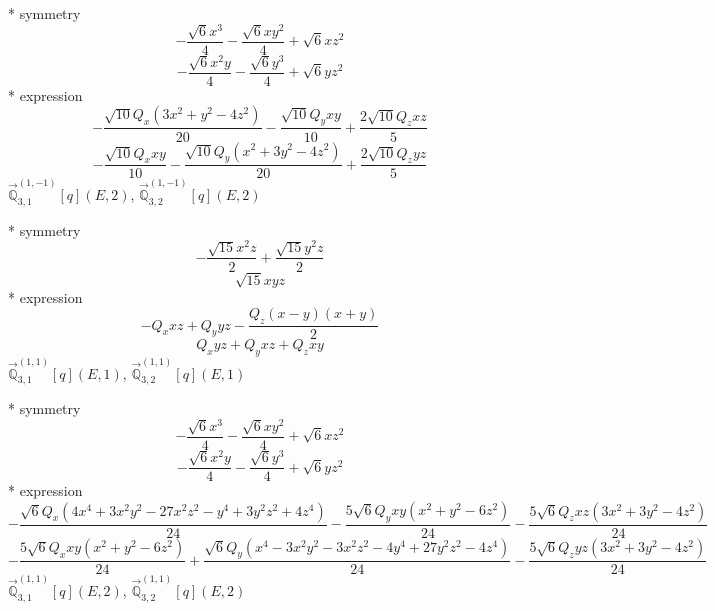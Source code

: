 \documentclass[fleqn,8pt]{jsarticle}
\begin{document}
\noindent\quad ** symmetry
\begin{dmath*}
- \frac{\sqrt{6} x^{3}}{4} - \frac{\sqrt{6} x y^{2}}{4} + \sqrt{6} x z^{2}
\end{dmath*}
\begin{dmath*}
- \frac{\sqrt{6} x^{2} y}{4} - \frac{\sqrt{6} y^{3}}{4} + \sqrt{6} y z^{2}
\end{dmath*}
\noindent\quad ** expression
\begin{dmath*}
- \frac{\sqrt{10} Q_{x} \left(3 x^{2} + y^{2} - 4 z^{2}\right)}{20} - \frac{\sqrt{10} Q_{y} x y}{10} + \frac{2 \sqrt{10} Q_{z} x z}{5}
\end{dmath*}
\begin{dmath*}
- \frac{\sqrt{10} Q_{x} x y}{10} - \frac{\sqrt{10} Q_{y} \left(x^{2} + 3 y^{2} - 4 z^{2}\right)}{20} + \frac{2 \sqrt{10} Q_{z} y z}{5}
\end{dmath*}
\noindent\quad $\vec{\mathbb{Q}}_{3,1}^{(1,-1)}[q](E,2)$, $\vec{\mathbb{Q}}_{3,2}^{(1,-1)}[q](E,2)$

\noindent\quad ** symmetry
\begin{dmath*}
- \frac{\sqrt{15} x^{2} z}{2} + \frac{\sqrt{15} y^{2} z}{2}
\end{dmath*}
\begin{dmath*}
\sqrt{15} x y z
\end{dmath*}
\noindent\quad ** expression
\begin{dmath*}
- Q_{x} x z + Q_{y} y z - \frac{Q_{z} \left(x - y\right) \left(x + y\right)}{2}
\end{dmath*}
\begin{dmath*}
Q_{x} y z + Q_{y} x z + Q_{z} x y
\end{dmath*}
\noindent\quad $\vec{\mathbb{Q}}_{3,1}^{(1,1)}[q](E,1)$, $\vec{\mathbb{Q}}_{3,2}^{(1,1)}[q](E,1)$

\noindent\quad ** symmetry
\begin{dmath*}
- \frac{\sqrt{6} x^{3}}{4} - \frac{\sqrt{6} x y^{2}}{4} + \sqrt{6} x z^{2}
\end{dmath*}
\begin{dmath*}
- \frac{\sqrt{6} x^{2} y}{4} - \frac{\sqrt{6} y^{3}}{4} + \sqrt{6} y z^{2}
\end{dmath*}
\noindent\quad ** expression
\begin{dmath*}
- \frac{\sqrt{6} Q_{x} \left(4 x^{4} + 3 x^{2} y^{2} - 27 x^{2} z^{2} - y^{4} + 3 y^{2} z^{2} + 4 z^{4}\right)}{24} - \frac{5 \sqrt{6} Q_{y} x y \left(x^{2} + y^{2} - 6 z^{2}\right)}{24} - \frac{5 \sqrt{6} Q_{z} x z \left(3 x^{2} + 3 y^{2} - 4 z^{2}\right)}{24}
\end{dmath*}
\begin{dmath*}
- \frac{5 \sqrt{6} Q_{x} x y \left(x^{2} + y^{2} - 6 z^{2}\right)}{24} + \frac{\sqrt{6} Q_{y} \left(x^{4} - 3 x^{2} y^{2} - 3 x^{2} z^{2} - 4 y^{4} + 27 y^{2} z^{2} - 4 z^{4}\right)}{24} - \frac{5 \sqrt{6} Q_{z} y z \left(3 x^{2} + 3 y^{2} - 4 z^{2}\right)}{24}
\end{dmath*}
\noindent\quad $\vec{\mathbb{Q}}_{3,1}^{(1,1)}[q](E,2)$, $\vec{\mathbb{Q}}_{3,2}^{(1,1)}[q](E,2)$
\end{document}
